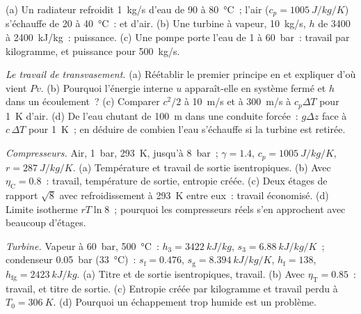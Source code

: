 \begin{exercise}[$\star$]\label{exo:b2:open-systems:4}
(a) Un radiateur refroidit \qty{1}{kg/s} d'eau de \qty{90}{} à \qty{80}{\celsius}~;
l'air ($c_p = \qty{1005}{J/kg/K}$) s'échauffe de \qty{20}{} à \qty{40}{\celsius}~:
 et  d'air. (b) Une turbine à vapeur, \qty{10}{kg/s},
$h$ de \qty{3400}{} à \qty{2400}{kJ/kg}~: puissance. (c) Une pompe porte
l'eau de \qty{1}{} à \qty{60}{bar}~: travail par kilogramme, et puissance pour
\qty{500}{kg/s}.
\end{exercise}

\begin{exercise}[$\star\star$]\label{exo:b2:open-systems:5}
\emph{Le travail de transvasement.} (a) Réétablir le premier principe en  et
expliquer d'où vient $Pv$. (b) Pourquoi l'énergie interne $u$
apparaît-elle en système fermé et $h$ dans un écoulement~? (c) Comparer $c^2/2$ à
\qty{10}{m/s} et à \qty{300}{m/s} à $c_p\Delta T$ pour \qty{1}{K} d'air.
(d) De l'eau chutant de \qty{100}{m} dans une conduite forcée~: $g\Delta z$ face à
$c\,\Delta T$ pour \qty{1}{K}~; en déduire de combien l'eau s'échauffe si la
turbine est retirée.
\end{exercise}

\begin{exercise}[$\star\star$]\label{exo:b2:open-systems:6}
\emph{Compresseurs.} Air, \qty{1}{bar}, \qty{293}{K}, jusqu'à \qty{8}{bar}~; $\gamma =
1.4$, $c_p = \qty{1005}{J/kg/K}$, $r = \qty{287}{J/kg/K}$. (a) Température et
travail de sortie isentropiques. (b) Avec $\eta_{\text{C}} = 0.8$~: travail, température
de sortie, entropie créée. (c) Deux étages de rapport $\sqrt8$ avec
refroidissement à \qty{293}{K} entre eux~: travail économisé. (d) Limite
isotherme $rT\ln 8$~; pourquoi les compresseurs réels s'en approchent avec beaucoup d'étages.
\end{exercise}

\begin{exercise}[$\star\star$]\label{exo:b2:open-systems:7}
\emph{Turbine.} Vapeur à \qty{60}{bar}, \qty{500}{\celsius}~: $h_3 = \qty{3422}{kJ/kg}$,
$s_3 = \qty{6.88}{kJ/kg/K}$~; condenseur \qty{0.05}{bar} (\qty{33}{\celsius})~:
$s_{\text{f}} = 0.476$, $s_{\text{g}} = \qty{8.394}{kJ/kg/K}$, $h_{\text{f}} = 138$,
$h_{\text{fg}} = \qty{2423}{kJ/kg}$. (a) Titre et  de sortie
isentropiques, travail. (b) Avec $\eta_{\text{T}} = 0.85$~: travail,  et titre
de sortie. (c) Entropie créée par kilogramme et travail perdu à $T_0 =
\qty{306}{K}$. (d) Pourquoi un échappement trop humide est un problème.
\end{exercise}

